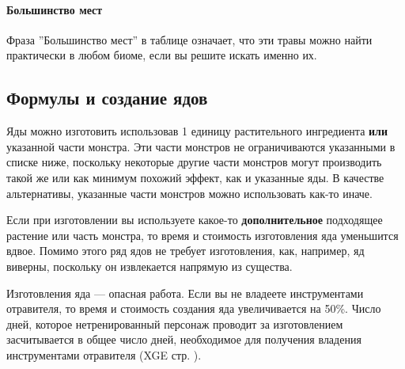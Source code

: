 \documentclass[a4paper, 9pt, twocolumn]{book}
\begin{document}
	\paragraph*{Большинство мест}
	
	Фраза ''Большинство мест'' в таблице означает, что эти травы можно найти практически в любом биоме, если вы решите искать именно их.
	
	\subsection{Формулы и создание ядов}
	
	Яды можно изготовить использовав 1 единицу растительного ингредиента \textbf{или} указанной части монстра. Эти части монстров не ограничиваются указанными в списке ниже, поскольку некоторые другие части монстров могут производить такой же или как минимум похожий эффект, как и указанные яды. В качестве альтернативы, указанные части монстров можно использовать как-то иначе.
	
	Если при изготовлении вы используете какое-то \textbf{дополнительное} подходящее растение или часть монстра, то время и стоимость  изготовления яда уменьшится вдвое. Помимо этого ряд ядов не требует изготовления, как, например, яд виверны, поскольку он извлекается напрямую из существа.
	
	Изготовления яда --- опасная работа. Если вы не владеете инструментами отравителя, то время и стоимость создания яда увеличивается на 50\%. Число дней, которое нетренированный персонаж проводит за изготовлением засчитывается в общее число дней, необходимое для получения владения инструментами отравителя (XGE стр. ). %
	
\end{document}
